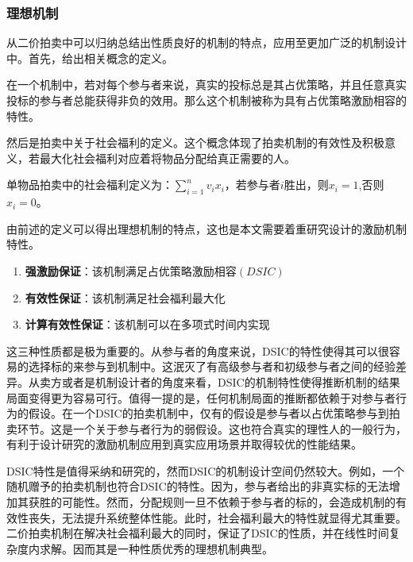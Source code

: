 \documentclass[promaster]{thesis-uestc}
\begin{document}
\subsubsection{理想机制}

从二价拍卖中可以归纳总结出性质良好的机制的特点，应用至更加广泛的机制设计中。首先，给出相关概念的定义。

\begin{definition}
    在一个机制中，若对每个参与者来说，真实的投标总是其占优策略，并且任意真实投标的参与者总能获得非负的效用。那么这个机制被称为具有占优策略激励相容的特性。
\end{definition}

然后是拍卖中关于社会福利的定义。这个概念体现了拍卖机制的有效性及积极意义，若最大化社会福利对应着将物品分配给真正需要的人。

\begin{definition}[社会福利]
    单物品拍卖中的社会福利定义为：$\sum_{i=1}^{n}{v_ix_i}$，若参与者$i$胜出，则$x_i=1$,否则$x_i=0$。
\end{definition}

由前述的定义可以得出理想机制的特点，这也是本文需要着重研究设计的激励机制特性。

\begin{enumerate}
    \item \textbf{强激励保证}：该机制满足占优策略激励相容$(DSIC)$
    \item  \textbf{有效性保证}：该机制满足社会福利最大化
    \item \textbf{计算有效性保证}：该机制可以在多项式时间内实现
\end{enumerate}

这三种性质都是极为重要的。从参与者的角度来说，DSIC的特性使得其可以很容易的选择标的来参与到机制中。这泯灭了有高级参与者和初级参与者之间的经验差异。从卖方或者是机制设计者的角度来看，DSIC的机制特性使得推断机制的结果局面变得更为容易可行。值得一提的是，任何机制局面的推断都依赖于对参与者行为的假设。在一个DSIC的拍卖机制中，仅有的假设是参与者以占优策略参与到拍卖环节。这是一个关于参与者行为的弱假设。这也符合真实的理性人的一般行为，有利于设计研究的激励机制应用到真实应用场景并取得较优的性能结果。

DSIC特性是值得采纳和研究的，然而DSIC的机制设计空间仍然较大。例如，一个随机赠予的拍卖机制也符合DSIC的特性。因为，参与者给出的非真实标的无法增加其获胜的可能性。然而，分配规则一旦不依赖于参与者的标的，会造成机制的有效性丧失，无法提升系统整体性能。此时，社会福利最大的特性就显得尤其重要。二价拍卖机制在解决社会福利最大的同时，保证了DSIC的性质，并在线性时间复杂度内求解。因而其是一种性质优秀的理想机制典型。
\end{document}
